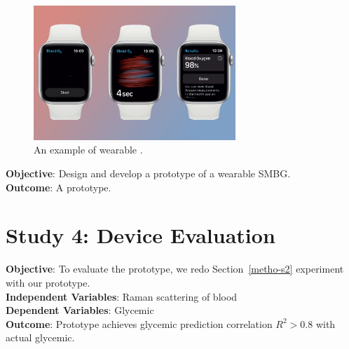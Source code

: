 \begin{figure}
    \caption{An example of wearable \citep{applewatch}.}
    \centerline{\includegraphics[width=3in]{figures/example-wearable-applewatch.jpg}}\label{fig:applewatch}
\end{figure}


\textbf{Objective}: Design and develop a prototype of a wearable SMBG.\\
\textbf{Outcome}: A prototype.

\section{Study 4: Device Evaluation}

\textbf{Objective}: To evaluate the prototype, we redo Section~\ref{metho-s2} experiment with our prototype.\\
\textbf{Independent Variables}: Raman scattering of blood\\
\textbf{Dependent Variables}: Glycemic\\
\textbf{Outcome}: Prototype achieves glycemic prediction correlation $R^2 > 0.8$ with actual glycemic.